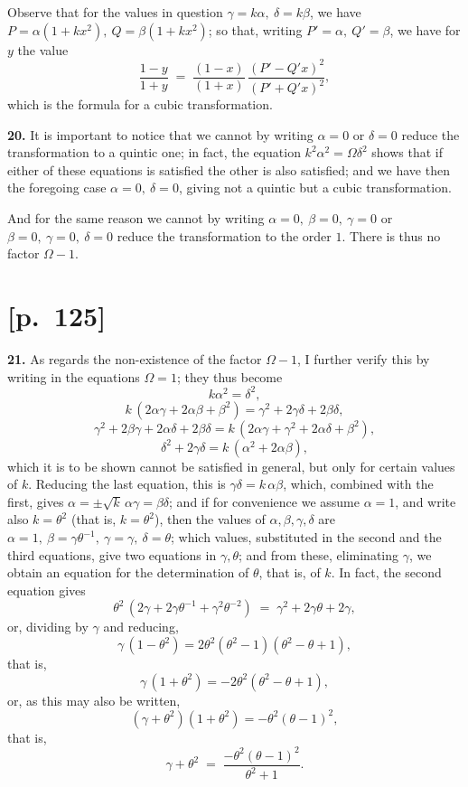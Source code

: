 \documentclass[11pt]{article}
\begin{document}
Observe that for the values in question $\gamma=k\alpha,\ \delta=k\beta$,
we have $P = \alpha(1 + k x^2),\ Q = \beta(1 + k x^2)$; so that, writing
$P' = \alpha,\ Q' = \beta$, we have for $y$ the value
\[
\frac{1-y}{1+y} \;=\; \frac{(1-x)}{(1+x)}\,\frac{(P' - Q' x)^2}{(P' + Q' x)^2},
\]
which is the formula for a cubic transformation.

\medskip
\textbf{20.} It is important to notice that we cannot by writing
$\alpha=0$ or $\delta=0$ reduce the transformation to a quintic one; in
fact, the equation $k^2\alpha^2 = \Omega\delta^2$ shows that if either of
these equations is satisfied the other is also satisfied; and we have then
the foregoing case $\alpha=0,\ \delta=0$, giving not a quintic but a cubic
transformation.

And for the same reason we cannot by writing $\alpha=0,\ \beta=0,\ \gamma=0$
or $\beta=0,\ \gamma=0,\ \delta=0$ reduce the transformation to the order
$1$. There is thus no factor $\Omega - 1$.

\section*{[p.~125]}

\textbf{21.} As regards the non-existence of the factor $\Omega - 1$, I
further verify this by writing in the equations $\Omega = 1$; they thus
become
\[
k\alpha^2 = \delta^2,
\]
\[
k\,(2\alpha\gamma + 2\alpha\beta + \beta^2) = \gamma^2 + 2\gamma\delta + 2\beta\delta,
\]
\[
\gamma^2 + 2\beta\gamma + 2\alpha\delta + 2\beta\delta = k\,(2\alpha\gamma + \gamma^2 + 2\alpha\delta + \beta^2),
\]
\[
\delta^2 + 2\gamma\delta = k\,(\alpha^2 + 2\alpha\beta),
\]
which it is to be shown cannot be satisfied in general, but only for
certain values of $k$. Reducing the last equation, this is
$\gamma\delta = k\,\alpha\beta$, which, combined with the first, gives
$\alpha = \pm \sqrt{k}\,\alpha\gamma = \beta\delta$; and if for convenience
we assume $\alpha=1$, and write also $k = \theta^2$ (that is,
$k = \theta^2$), then the values of $\alpha,\beta,\gamma,\delta$ are
$\alpha=1,\ \beta = \gamma\theta^{-1},\ \gamma=\gamma,\ \delta=\theta$; which
values, substituted in the second and the third equations, give two
equations in $\gamma, \theta$; and from these, eliminating $\gamma$, we
obtain an equation for the determination of $\theta$, that is, of $k$. In
fact, the second equation gives
\[
\theta^2\,(2\gamma + 2\gamma\theta^{-1} + \gamma^2\theta^{-2})
\;=\; \gamma^2 + 2\gamma\theta + 2\gamma,
\]
or, dividing by $\gamma$ and reducing,
\[
\gamma\,(1 - \theta^2) = 2\theta^2(\theta^2 - 1)(\theta^2 - \theta + 1),
\]
that is,
\[
\gamma\,(1 + \theta^2) = -2\theta^2(\theta^2 - \theta + 1),
\]
or, as this may also be written,
\[
(\gamma + \theta^2)(1 + \theta^2) = -\theta^2(\theta - 1)^2,
\]
that is,
\[
\gamma + \theta^2 \;=\; \frac{-\theta^2(\theta - 1)^2}{\theta^2 + 1}.
\]
\end{document}
